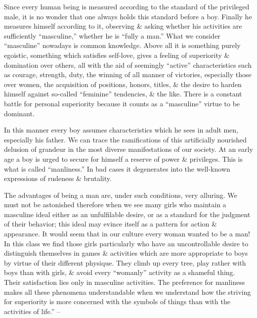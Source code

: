 \documentclass{article}
\begin{document}
Since every human being is measured according to the standard of the privileged male, it is no wonder that one always holds this standard before a boy. Finally he measures himself according to it, observing \& asking whether his activities are sufficiently ``masculine,'' whether he is ``fully a man.'' What we consider ``masculine'' nowadays is common knowledge. Above all it is something purely egoistic, something which satisfies self-love, gives a feeling of superiority \& domination over others, all with the aid of seemingly ``active'' characteristics such as courage, strength, duty, the winning of all manner of victories, especially those over women, the acquisition of positions, honors, titles, \& the desire to harden himself against so-called ``feminine'' tendencies, \& the like. There is a constant battle for personal superiority because it counts as a ``masculine'' virtue to be dominant.

In this manner every boy assumes characteristics which he sees in adult men, especially his father. We can trace the ramifications of this artificially nourished delusion of grandeur in the most diverse manifestations of our society. At an early age a boy is urged to secure for himself a reserve of power \& privileges. This is what is called ``manliness.'' In bad cases it degenerates into the well-known expressions of rudeness \& brutality.

The advantages of being a man are, under such conditions, very alluring. We must not be astonished therefore when we see many girls who maintain a masculine ideal either as an unfulfilable desire, or as a standard for the judgment of their behavior; this ideal may evince itself as a pattern for action \& appearance. It would seem that in our culture every woman wanted to be a man! In this class we find those girls particularly who have an uncontrollable desire to distinguish themselves in games \& activities which are more appropriate to boys by virtue of their different physique. They climb up every tree, play rather with boys than with girls, \& avoid every ``womanly'' activity as a shameful thing. Their satisfaction lies only in masculine activities. The preference for manliness makes all these phenomena understandable when we understand how the striving for superiority is more concerned with the symbols of things than with the activities of life.'' -- \cite[pp. 122--129]{Adler_human_nature}
\end{document}
